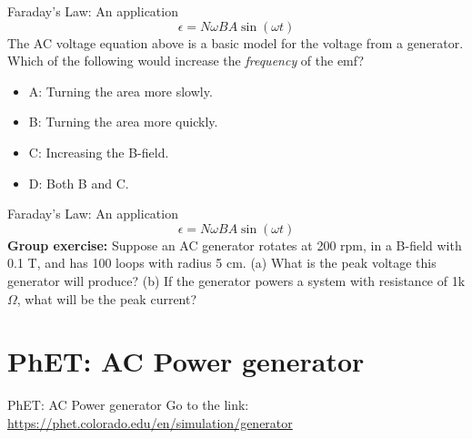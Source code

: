 \documentclass{beamer}
\begin{document}
\begin{frame}{Faraday's Law: An application}
\begin{equation}
\epsilon = N\omega BA \sin(\omega t)
\end{equation}
The AC voltage equation above is a basic model for the voltage from a generator.  Which of the following would increase the \textit{frequency} of the emf?
\begin{itemize}
\item A: Turning the area more slowly.
\item B: Turning the area more quickly.
\item C: Increasing the B-field.
\item D: Both B and C.
\end{itemize}
\end{frame}

\begin{frame}{Faraday's Law: An application}
\begin{equation}
\epsilon = N\omega BA \sin(\omega t)
\end{equation}
\textbf{Group exercise:} Suppose an AC generator rotates at 200 rpm, in a B-field with 0.1 T, and has 100 loops with radius 5 cm.  (a) What is the peak voltage this generator will produce? (b) If the generator powers a system with resistance of 1k$\Omega$, what will be the peak current?
\end{frame}

\section{PhET: AC Power generator}

\begin{frame}{PhET: AC Power generator}
\small
Go to the link: \\ \vspace{0.5cm}
\url{https://phet.colorado.edu/en/simulation/generator}
\end{frame}
\end{document}
